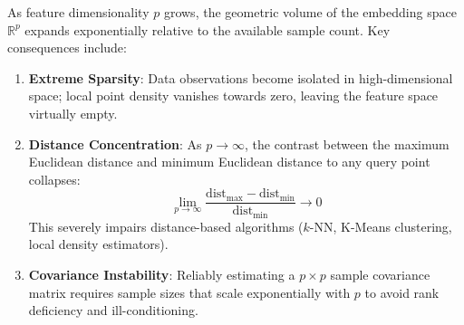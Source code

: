 As feature dimensionality $p$ grows, the geometric volume of the embedding space $\mathbb{R}^p$ expands exponentially relative to the available sample count. Key consequences include:
\begin{enumerate}
    \item \textbf{Extreme Sparsity}: Data observations become isolated in high-dimensional space; local point density vanishes towards zero, leaving the feature space virtually empty.
    \item \textbf{Distance Concentration}: As $p \to \infty$, the contrast between the maximum Euclidean distance and minimum Euclidean distance to any query point collapses:
    \begin{equation}
        \lim_{p \to \infty} \frac{\mathrm{dist}_{\max} - \mathrm{dist}_{\min}}{\mathrm{dist}_{\min}} \to 0
    \end{equation}
    This severely impairs distance-based algorithms ($k$-NN, K-Means clustering, local density estimators).
    \item \textbf{Covariance Instability}: Reliably estimating a $p \times p$ sample covariance matrix requires sample sizes that scale exponentially with $p$ to avoid rank deficiency and ill-conditioning.
\end{enumerate}

